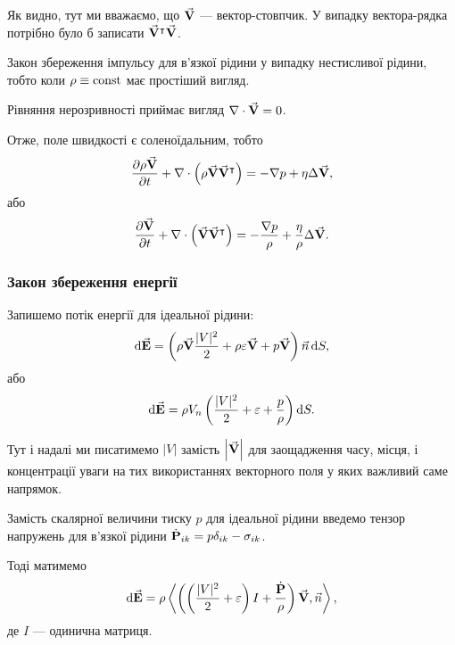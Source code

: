 \begin{remark}
	Як видно, тут ми вважаємо, що $\vecf V$ --- вектор-стовпчик. У випадку вектора-рядка потрібно було б записати $\vecf V^\intercal \vecf V$.
\end{remark}

\begin{remark}
	Закон збереження імпульсу для в'язкої рідини у випадку нестисливої рідини, тобто коли $\rho \equiv \const$ має простіший вигляд.
\end{remark}
	
Рівняння нерозривності приймає вигляд $\nabla \cdot \vecf V = 0$. \medskip

Отже, поле швидкості є соленоїдальним, тобто
\begin{equation}
	\frac{\partial \rho \vecf V}{\partial t} + \nabla \cdot \Big(\rho \vecf V \vecf V^\intercal\Big) = - \nabla p + \eta \Delta \vecf V,
\end{equation}
або
\begin{equation}
	\frac{\partial \vecf V}{\partial t} + \nabla \cdot \Big(\vecf V \vecf V^\intercal\Big) = - \frac{\nabla p}{\rho} + \frac{\eta}{\rho} \Delta \vecf V.
\end{equation}

\subsubsection{Закон збереження енергії}

Запишемо потік енергії для ідеальної рідини:
\begin{equation}
	\diff \vecf E = \left( \rho \vecf V \frac{|V|^2}{2} + \rho \epsilon \vecf V + p \vecf V\right) \vec n \diff S,
\end{equation}
або
\begin{equation}
	\diff \vecf E = \rho V_n \left( \frac{|V|^2}{2} + \epsilon + \frac{p}{\rho}\right)\diff S.
\end{equation}

\begin{remark}
	Тут і надалі ми писатимемо $|V|$ замість $\left|\vecf V\right|$ для заощадження часу, місця, і концентрації уваги на тих використаннях векторного поля у яких важливий саме напрямок.
\end{remark}

Замість скалярної величини тиску $p$ для ідеальної рідини введемо тензор напружень для в'язкої рідини $\dot{\bf{P}}_{ik} = p \delta_{ik} - \sigma_{ik}$. \medskip

Тоді матимемо 
\begin{equation}
	\diff \vecf E = \rho \langle\left(\left( \frac{|V|^2}{2} + \epsilon \right) I + \frac{\dot{\bf{P}}}{\rho} \right)\vecf V, \vec n \rangle,
\end{equation}
де $I$ --- одинична матриця. \medskip

